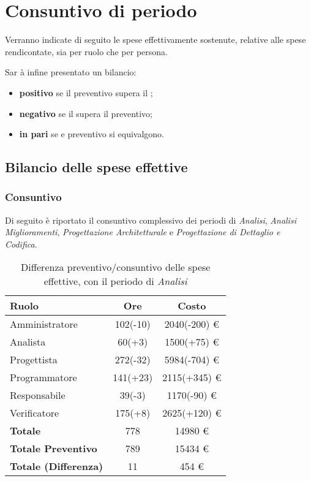 \section{Consuntivo di periodo} %
Verranno indicate di seguito le spese effettivamente sostenute, relative alle spese rendicontate, sia per ruolo che per persona.

Sar \`a infine presentato un bilancio:
\begin{itemize}
\item \textbf{positivo} se il preventivo supera il ;
\item \textbf{negativo} se il  supera il preventivo;
\item \textbf{in pari} se  e preventivo si equivalgono.
\end{itemize}

\subsection{Bilancio delle spese effettive}
\subsubsection{Consuntivo}
Di seguito \`e riportato il consuntivo complessivo dei periodi di \textit{Analisi}, \textit{Analisi Miglioramenti}, \textit{Progettazione Architetturale} e \textit{Progettazione di Dettaglio e Codifica}.


\begin{table}[H]
	\centering
	\begin{tabular}{ l c c }
		\textbf{Ruolo} & \textbf{Ore} & \textbf{Costo} \\
		\hline
		Amministratore & 102(-10) & 2040(-200) \euro{} \\
		Analista & 60(+3) & 1500(+75) \euro{} \\
		Progettista & 272(-32) & 5984(-704) \euro{} \\
		Programmatore & 141(+23) & 2115(+345) \euro{} \\
		Responsabile & 39(-3) & 1170(-90) \euro{} \\
		Verificatore & 175(+8) & 2625(+120) \euro{} \\
		\hline
		\textbf{Totale \glossaryItem{Consuntivo}} & 778 & 14980 \euro{} \\
		\hline
		\textbf{Totale Preventivo} & 789 & 15434 \euro{} \\
		\hline
		\textbf{Totale (Differenza)} & 11 & 454 \euro{} \\
		\hline
	\end{tabular}
	\caption{Differenza preventivo/consuntivo delle spese effettive, con il periodo di \textit{Analisi}}
\end{table}


